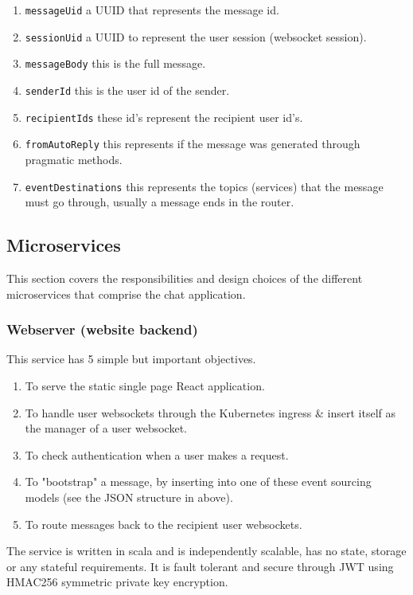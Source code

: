 \begin{enumerate}
    \item \texttt{messageUid} a UUID that represents the message id.
    \item \texttt{sessionUid} a UUID to represent the user session (websocket session).
    \item \texttt{messageBody} this is the full message.
    \item \texttt{senderId} this is the user id of the sender.
    \item \texttt{recipientIds} these id's represent the recipient user id's.
    \item \texttt{fromAutoReply} this represents if the message was generated through pragmatic methods.
    \item \texttt{eventDestinations} this represents the topics (services) that the message must go through, usually a message ends in the router.
\end{enumerate}

\subsection{Microservices}
This section covers the responsibilities and design choices of the different microservices that comprise the chat application.

\subsubsection{Webserver (website backend)}
This service has 5 simple but important objectives.
\begin{enumerate}
    \item To serve the static single page React application.
    \item To handle user websockets through the Kubernetes ingress \& insert itself as the manager of a user websocket.
    \item To check authentication when a user makes a request.
    \item To "bootstrap" a message, by inserting into one of these event sourcing models (see the JSON structure in above).
    \item To route messages back to the recipient user websockets.
\end{enumerate}
The service is written in scala and is independently scalable, has no state, storage or any stateful requirements.
It is fault tolerant and secure through JWT using HMAC256 symmetric private key encryption.

